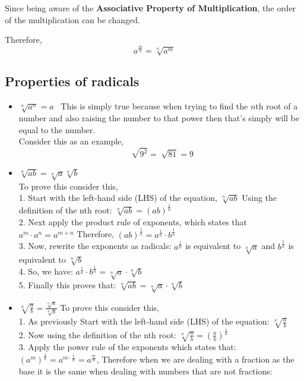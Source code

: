 Since being aware of the \textbf{Associative Property of Multiplication}, the order of the multiplication can be changed. 

Therefore, 
$$ a^{\frac{m}{n}} = \sqrt[n]{a^m} $$

\subsection{Properties of radicals}
\begin{itemize}
  \item $\sqrt[n]{a^n} = a$ \ This is simply true because when trying to find the $n$th root of a number and  also raising the number to that power then that's simply will be equal to the number.  \\
Consider this as an example,
$$ \sqrt[]{9^2} = \sqrt[]{81} = 9$$
   \item $ \sqrt[n]{ab} = \sqrt[n]{a} \sqrt[n]{b} $ \\
   To prove this consider this, \\
    1. Start with the left-hand side (LHS) of the equation,
    $ \sqrt[n]{ab} $ Using the definition of the nth root:
    $ \sqrt[n]{ab} = (ab)^{\frac{1}{n}} $ \\
    2. Next apply the product rule of exponents, which states that $ a^m \cdot a^n = a^{m+n} $ Therefore, $ (ab)^{\frac{1}{n}} = a^{\frac{1}{n}} \cdot b^{\frac{1}{n}} $ \\ 
    3. Now, rewrite the exponents as radicals:
    $ a^{\frac{1}{n}} $ is equivalent to $ \sqrt[n]{a} $ and $ b^{\frac{1}{n}} $ is equivalent to $ \sqrt[n]{b} $ \\
    4. So, we have: $ a^{\frac{1}{n}} \cdot b^{\frac{1}{n}} = \sqrt[n]{a} \cdot \sqrt[n]{b} $ \\
    5. Finally this proves that: $ \sqrt[n]{ab} = \sqrt[n]{a} \cdot \sqrt[n]{b} $
    \item $ \sqrt[n]{\frac{a}{b}} = \frac{\sqrt[n]{a}}{\sqrt[n]{b}} $ To prove this consider this, \\
    1. As previously Start with the left-hand side (LHS) of the equation: $ \sqrt[n]{\frac{a}{b}} $ \\
    2. Now using the definition of the nth root: $ \sqrt[n]{\frac{a}{b}} = \left(\frac{a}{b}\right)^{\frac{1}{n}} $ \\
    3. Apply the power rule of the exponents which states that: \\ $ (a^m)^{\frac{1}{n}} = a^{m \cdot \frac{1}{n}} = a^{\frac{m}{n}}$, Therefore when we are dealing with a fraction as the base it is the same when dealing with numbers that are not fractions: 

\end{itemize}
